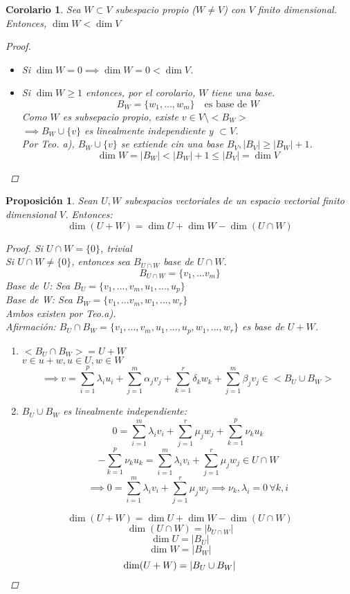 \documentclass[11pt]{book}
\newtheorem{prop}[thm]{Proposición}
\newtheorem*{cor}{Corolario}
\theoremstyle{definition}
\begin{document}
\begin{cor}
	Sea $W\subset V$ subespacio propio ($W\neq V$) con $V$ finito dimensional.
	Entonces, $\dim W< \dim V$
	\begin{proof}
	\begin{itemize}
		\item Si $\dim W=0\implies \dim W=0<\dim V$.
		
		\item Si $\dim W\geq 1$ entonces, por el corolario, $W$ tiene una base.
		\[
		B_W=\{w_1,...,w_m\}\quad\textrm{es base de } W
		\]
		Como $W$ es subsepacio propio, existe $v\in V\setminus<B_W>$\\
		$\implies B_W\cup\{v\}$ es linealmente independiente y $\subset V$.\\
		Por Teo. a), $B_W\cup\{v\}$ se extiende cin una base $B_V,|B_V|\geq|B_W|+1$.
		\[
		\dim W=|B_W|<|B_W|+1\leq |B_V|=\dim V
		\]
	\end{itemize}
	\end{proof}	
\end{cor}


\begin{prop}
Sean $U,W$ subespacios vectoriales de un espacio vectorial finito dimensional $V$. Entonces:
\[
\dim (U+W)=\dim U+\dim W-\dim (U\cap W)
\]
\begin{proof}
Si $U\cap W=\{0\}$, trivial\\
Si $U\cap W\neq\{0\}$, entonces sea $B_{U\cap W}$ base de $U\cap W$.
\[
B_{U\cap W}=\{v_1,...v_m\}
\]
Base de U: Sea $B_U=\{v_1,...,v_m,u_1,...,u_p\}$\\
Base de W: Sea $B_W=\{v_1,...v_m,w_1,...,w_r\}$\\
Ambos existen por Teo.a).\\
Afirmación: $B_U\cap B_W=\{v_1,...,v_m,u_1,...,u_p,w_1,...,w_r\}$ es base de $U+W$.
\begin{enumerate}
	\item $<B_U\cap B_W>=U+W$\\
	$v\in u+w,u\in U,w\in W$
	\[
	\implies v=\sum^{p}_{i=1}\lambda_i u_i+\sum^{m}_{j=1}\alpha_j v_j+\sum^{r}_{k=1}\delta_k w_k+\sum^{m}_{j=1}\beta_j v_j\in<B_U\cup B_W>
	\]
	
	\item $B_U\cup B_W$ es linealmente independiente:
	\[
	0=\sum^{m}_{i=1}\lambda_i v_i+\sum^{r}_{j=1}\mu_j w_j+\sum^{p}_{k=1}\nu_k u_k
	\]
	\[
	-\sum^{p}_{k=1}\nu_k u_k=\sum^{m}_{i=1}\lambda_i v_i+\sum^{r}_{j=1}\mu_j w_j \in U\cap W
	\]
	\[
	\implies 0=\sum^{m}_{i=1}\lambda_i v_i+\sum^{r}_{j=1}\mu_j w_j\implies \nu_k,\lambda_i=0\,\forall k,i
	\]
\end{enumerate}
\[\dim(U+W)=\dim U+\dim W-\dim(U\cap W)\]
\[\dim(U\cap W)=|b_{U\cap W}|\]
\[\dim U=|B_U|\]	
\[\dim W=|B_W|\]	
\[\dim(U+W)=|B_U\cup B_W|\qedhere\]
\end{proof}
\end{prop}
\end{document}
